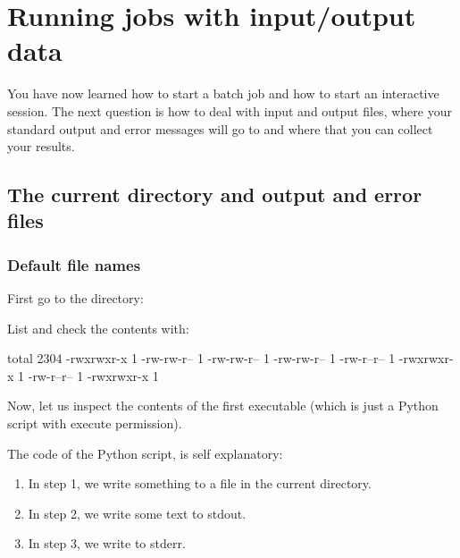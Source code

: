 \chapter{Running jobs with input/output data}
\label{ch:running-jobs-with-input-output-data}

You have now learned how to start a batch job and how to start an interactive
session.  The next question is how to deal with input and output files, where
your standard output and error messages will go to and where that you can
collect your results.

\section{The current directory and output and error files}

\subsection{Default file names}

First go to the directory:

\begin{prompt}
\end{prompt}

List and check the contents with:
\begin{prompt}
total 2304
-rwxrwxr-x 1 %
-rw-rw-r-- 1 %
-rw-rw-r-- 1 %
-rw-rw-r-- 1 %
-rw-r--r-- 1 %
-rwxrwxr-x 1 %
-rw-r--r-- 1 %
-rwxrwxr-x 1 %
\end{prompt}

Now, let us inspect the contents of the first executable (which is just a
Python script with execute permission).


The code of the Python script, is self explanatory:
\begin{enumerate}
\item  In step 1, we write something to a file in the current directory.
\item  In step 2, we write some text to stdout.
\item  In step 3, we write to stderr.
\end{enumerate}

